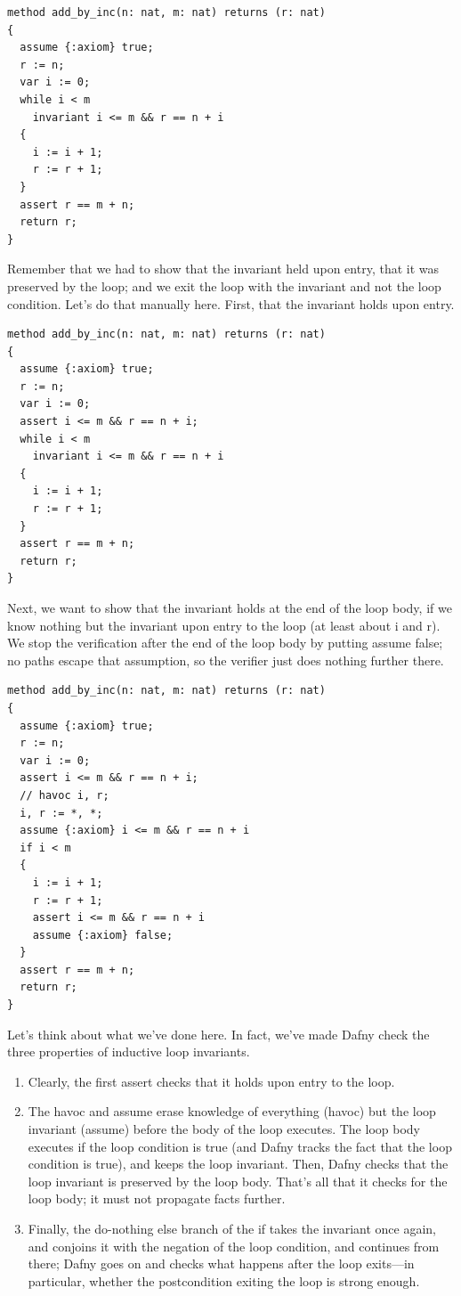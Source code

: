 \documentclass[11pt]{article}
\begin{document}
\begin{lstlisting}[language=dafny]
method add_by_inc(n: nat, m: nat) returns (r: nat)
{
  assume {:axiom} true;
  r := n;
  var i := 0;
  while i < m
    invariant i <= m && r == n + i
  {
    i := i + 1;
    r := r + 1;
  }
  assert r == m + n;
  return r;
}
\end{lstlisting}
Remember that we had to show that the invariant held upon entry, that it was preserved by the loop; and we
exit the loop with the invariant and not the loop condition. Let's do that manually here. First, that the invariant holds upon entry.
\begin{lstlisting}[language=dafny]
method add_by_inc(n: nat, m: nat) returns (r: nat)
{
  assume {:axiom} true;
  r := n;
  var i := 0;
  assert i <= m && r == n + i;
  while i < m
    invariant i <= m && r == n + i
  {
    i := i + 1;
    r := r + 1;
  }
  assert r == m + n;
  return r;
}
\end{lstlisting}
Next, we want to show that the invariant holds at the end of the loop body, if we know nothing but the invariant upon entry to the loop (at least about \textsf{i} and \textsf{r}).
We stop the verification after the end of the loop body by putting \textsf{assume false}; no paths escape that assumption, so the verifier just does nothing further there.
\begin{lstlisting}[language=dafny]
method add_by_inc(n: nat, m: nat) returns (r: nat)
{
  assume {:axiom} true;
  r := n;
  var i := 0;
  assert i <= m && r == n + i;
  // havoc i, r;
  i, r := *, *;
  assume {:axiom} i <= m && r == n + i
  if i < m
  {
    i := i + 1;
    r := r + 1;
    assert i <= m && r == n + i
    assume {:axiom} false;
  }
  assert r == m + n;
  return r;
}
\end{lstlisting}
Let's think about what we've done here. In fact, we've made Dafny
check the three properties of inductive loop invariants.
\begin{enumerate}[noitemsep] \item Clearly,
the first \textsf{assert} checks that it holds upon entry to the
loop.

\item The havoc and \textsf{assume} erase knowledge of everything (havoc)
but the loop invariant (\textsf{assume}) before the body of the loop executes. The loop
body executes if the loop condition is true (and Dafny tracks the fact that the loop condition is true),
and keeps the loop invariant. Then, Dafny checks that the loop
invariant is preserved by the loop body.  That's all that it checks
for the loop body; it must not propagate facts further.

\item   Finally,
the do-nothing else branch of the if takes the invariant once again,
and conjoins it with the negation of the loop condition, and continues
from there; Dafny goes on and checks what happens after the loop
exits---in particular, whether the postcondition exiting the loop is
strong enough.
\end{enumerate}
\end{document}
